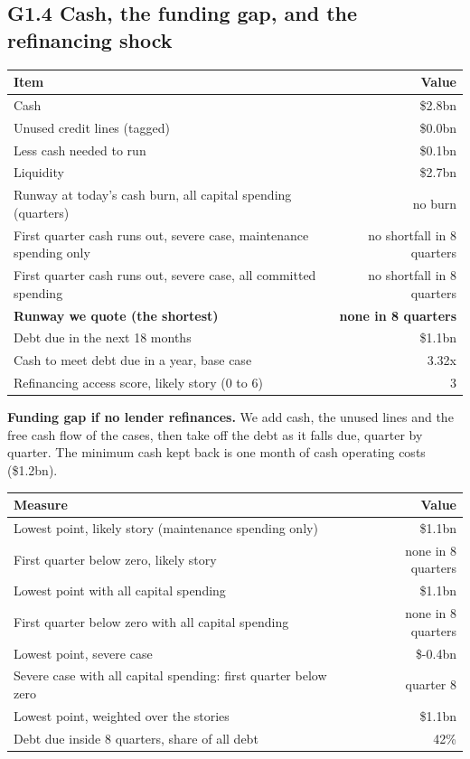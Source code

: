 \documentclass[11pt,a4paper]{article}
\begin{document}
\subsection*{G1.4 Cash, the funding gap, and the refinancing shock}
\begin{center}\footnotesize\setlength{\tabcolsep}{3.5pt}\begin{tabular}{@{}lr@{}}\toprule
Item & Value \\\midrule
Cash & \$2.8bn \\
Unused credit lines (tagged) & \$0.0bn \\
Less cash needed to run & \$0.1bn \\
Liquidity & \$2.7bn \\
Runway at today's cash burn, all capital spending (quarters) & no burn \\
First quarter cash runs out, severe case, maintenance spending only & no shortfall in 8 quarters \\
First quarter cash runs out, severe case, all committed spending & no shortfall in 8 quarters \\
\textbf{Runway we quote (the shortest)} & \textbf{none in 8 quarters} \\
Debt due in the next 18 months & \$1.1bn \\
Cash to meet debt due in a year, base case & 3.32x \\
Refinancing access score, likely story (0 to 6) & 3 \\
\bottomrule\end{tabular}\end{center}
\textbf{Funding gap if no lender refinances.} We add cash, the unused lines and the free cash flow of the cases, then take off the debt as it falls due, quarter by quarter. The minimum cash kept back is one month of cash operating costs (\$1.2bn).
\begin{center}\footnotesize\setlength{\tabcolsep}{3.5pt}\begin{tabular}{@{}lr@{}}\toprule
Measure & Value \\\midrule
Lowest point, likely story (maintenance spending only) & \$1.1bn \\
First quarter below zero, likely story & none in 8 quarters \\
Lowest point with all capital spending & \$1.1bn \\
First quarter below zero with all capital spending & none in 8 quarters \\
Lowest point, severe case & \$-0.4bn \\
Severe case with all capital spending: first quarter below zero & quarter 8 \\
Lowest point, weighted over the stories & \$1.1bn \\
Debt due inside 8 quarters, share of all debt & 42\% \\
\bottomrule\end{tabular}\end{center}
\end{document}
